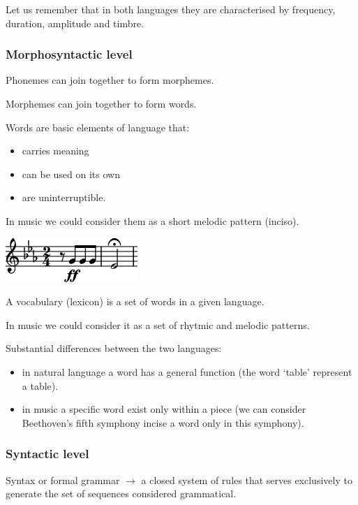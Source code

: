 Let us remember that in both languages they are characterised by frequency, duration, amplitude and timbre.

\subsubsection{Morphosyntactic level }\label{morphosyntactic-level}

Phonemes can join together to form morphemes.

Morphemes can join together to form words.

Words are basic elements of language that: 

\begin{itemize}
\item carries meaning 
\item can be used on its own 
\item are uninterruptible.
\end{itemize}

In music we could consider them as a short melodic pattern (inciso).

\begin{center}
\includegraphics[scale=0.7]{../img/inci.png}
\end{center}

A vocabulary (lexicon) is a set of words in a given language.

In music we could consider it as a set of rhytmic and melodic patterns.

Substantial differences between the two languages:

\begin{itemize}
\tightlist
\item in natural language a word has a general function (the word `table' represent a table).
\item in music a specific word exist only within a piece (we can consider Beethoven's fifth symphony incise a word only in this symphony).
\end{itemize}

\subsubsection{Syntactic level }\label{syntactic-level}

Syntax or formal grammar \(\rightarrow\) a closed system of rules that serves exclusively to generate the set of sequences considered grammatical.

